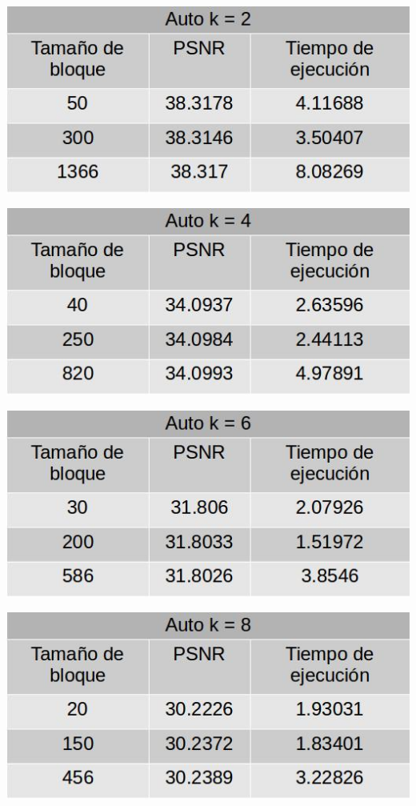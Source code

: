 \documentclass[a4paper]{article}
\begin{document}
\centerline{
\includegraphics[scale=0.5]{imagenes/autok2Tabla.jpg}
}
\vspace{1cm}

\centerline{
\includegraphics[scale=0.5]{imagenes/autok4Tabla.jpg}
}
\vspace{1cm}

\centerline{
\includegraphics[scale=0.5]{imagenes/autok6Tabla.jpg}
}
\vspace{1cm}

\centerline{
\includegraphics[scale=0.5]{imagenes/autok8Tabla.jpg}
}
\vspace{1cm}
\end{document}
